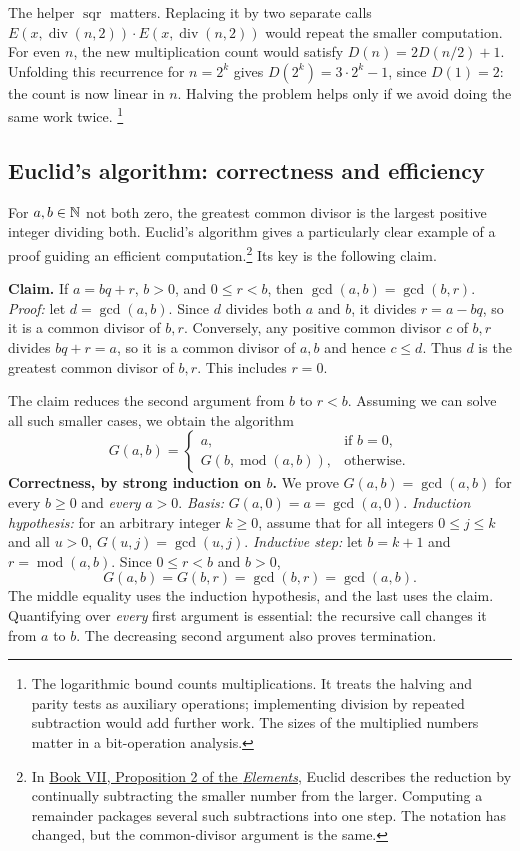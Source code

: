 The helper $\operatorname{sqr}$ matters. Replacing it by two separate calls
$E(x,\operatorname{div}(n,2))\cdot E(x,\operatorname{div}(n,2))$ would repeat
the smaller computation. For even $n$, the new multiplication count would
satisfy $D(n)=2D(n/2)+1$. Unfolding this recurrence for $n=2^k$ gives
$D(2^k)=3\cdot2^k-1$, since $D(1)=2$: the count is now linear in $n$.
Halving the problem helps only if we avoid doing the same work twice.
\footnote{The logarithmic bound counts multiplications. It treats the
halving and parity tests as auxiliary operations; implementing division by
repeated subtraction would add further work. The sizes of the multiplied
numbers matter in a bit-operation analysis.}

\subsection{Euclid's algorithm: correctness and efficiency}
\label{sec:alg-euclid}

For $a,b\in\mathbb{N}$ not both zero, the greatest common divisor is the largest
positive integer dividing both. Euclid's algorithm gives a particularly
clear example of a proof guiding an efficient computation.\footnote{In
\href{https://mathcs.clarku.edu/~djoyce/elements/bookVII/propVII2.html}{Book VII,
Proposition 2 of the \emph{Elements}}, Euclid describes the reduction by
continually subtracting the smaller number from the larger. Computing a
remainder packages several such subtractions into one step. The notation
has changed, but the common-divisor argument is the same.} Its key is the
following claim.

\textbf{Claim.} If $a=bq+r$, $b>0$, and $0\leq r<b$, then
$\gcd(a,b)=\gcd(b,r)$.
\emph{Proof:} let $d=\gcd(a,b)$. Since $d$ divides both $a$ and $b$, it
divides $r=a-bq$, so it is a common divisor of $b,r$. Conversely, any
positive common divisor $c$ of $b,r$ divides $bq+r=a$, so it is a common
divisor of $a,b$ and hence $c\leq d$. Thus $d$ is the greatest common
divisor of $b,r$. This includes $r=0$.

The claim reduces the second argument from $b$ to $r<b$. Assuming we can
solve all such smaller cases, we obtain the algorithm
\[
G(a,b)=\begin{cases}
a,&\text{if }b=0,\\
G(b,\operatorname{mod}(a,b)),&\text{otherwise}.
\end{cases}
\]
\textbf{Correctness, by strong induction on $b$.}
We prove $G(a,b)=\gcd(a,b)$ for every $b\geq0$ and \emph{every} $a>0$.
\emph{Basis:} $G(a,0)=a=\gcd(a,0)$.
\emph{Induction hypothesis:} for an arbitrary integer $k\geq0$,
assume that for all integers $0\leq j\leq k$ and all $u>0$,
$G(u,j)=\gcd(u,j)$.
\emph{Inductive step:} let $b=k+1$ and $r=\operatorname{mod}(a,b)$.
Since $0\leq r<b$ and $b>0$,
\[
G(a,b)=G(b,r)=\gcd(b,r)=\gcd(a,b).
\]
The middle equality uses the induction hypothesis, and the last uses the
claim. Quantifying over \emph{every} first argument is essential: the
recursive call changes it from $a$ to $b$. The decreasing second argument
also proves termination.

